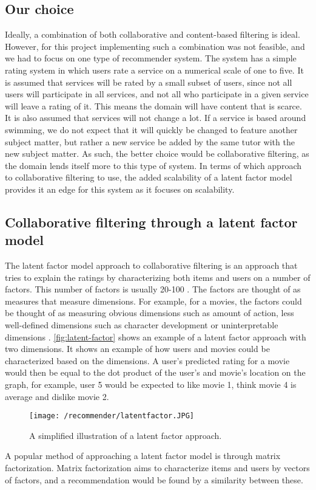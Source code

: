 \subsection{Our choice}
Ideally, a combination of both collaborative and content-based filtering is ideal.
However, for this project implementing such a combination was not feasible, and we had to focus on one type of recommender system.
The system has a simple rating system in which users rate a service on a numerical scale of one to five.
It is assumed that services will be rated by a small subset of users, since not all users will participate in all services, and not all who participate in a given service will leave a rating of it.
This means the domain will have content that is scarce.
It is also assumed that services will not change a lot.
If a service is based around swimming, we do not expect that it will quickly be changed to feature another subject matter, but rather a new service be added by the same tutor with the new subject matter.
As such, the better choice would be collaborative filtering, as the domain lends itself more to this type of system.
In terms of which approach to collaborative filtering to use, the added scalability of a latent factor model provides it an edge for this system as it focuses on scalability.

\subsection{Collaborative filtering through a latent factor model}
The latent factor model approach to collaborative filtering is an approach that tries to explain the ratings by characterizing both items and users on a number of factors.
This number of factors is usually 20-100 \cite{MatrixFactorization}. 
The factors are thought of as measures that measure dimensions.
For example, for a movies, the factors could be thought of as measuring obvious dimensions such as amount of action, less well-defined dimensions such as character development or uninterpretable dimensions \cite{MatrixFactorization}.
\autoref{fig:latent-factor} shows an example of a latent factor approach with two dimensions.
It shows an example of how users and movies could be characterized based on the dimensions.
A user's predicted rating for a movie would then be equal to the dot product of the user's and movie's location on the graph, for example, user 5 would be expected to like movie 1, think movie 4 is average and dislike movie 2.
\begin{figure}[H]
    \texttt{[image: /recommender/latentfactor.JPG]}
     \caption{A simplified illustration of a latent factor approach.}
     \label{fig:latent-factor}
 \end{figure}
 \noindent
A popular method of approaching a latent factor model is through matrix factorization.
Matrix factorization aims to characterize items and users by vectors of factors, and a recommendation would be found by a similarity between these.

